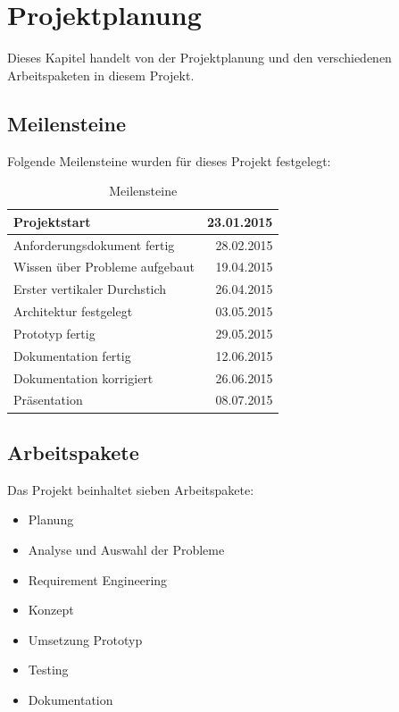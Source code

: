 %
%

\chapter{Projektplanung}\label{chap.projektplanung}
Dieses Kapitel handelt von der Projektplanung und den verschiedenen Arbeitspaketen in diesem Projekt.

\section{Meilensteine}\label{meilensteine}
Folgende Meilensteine wurden für dieses Projekt festgelegt:

\begin{table}[ht]
\centering
  \begin{tabular}{ l | r }
	\hline
	\rowcolor{gray}
	\textbf{Projektstart}			&	\textbf{23.01.2015}\\ \hline
	Anforderungsdokument fertig		&	28.02.2015	\\ \hline
	Wissen über Probleme aufgebaut		&	19.04.2015	\\ \hline
	Erster vertikaler Durchstich		& 	26.04.2015	\\ \hline
	Architektur festgelegt			&	03.05.2015	\\ \hline
	Prototyp fertig				&	29.05.2015	\\ \hline
	Dokumentation fertig			&	12.06.2015	\\ \hline
	Dokumentation korrigiert			&	26.06.2015	\\ \hline
	Präsentation					&	08.07.2015 \\ \hline
  \end{tabular}
   \caption{Meilensteine}\label{table:milestones}
\end{table}

\section{Arbeitspakete}\label{arbeitspakete}
Das Projekt beinhaltet sieben Arbeitspakete:
\begin{itemize}
\item Planung
\item Analyse und Auswahl der Probleme
\item Requirement Engineering
\item Konzept
\item Umsetzung Prototyp
\item Testing
\item Dokumentation
\end{itemize}

